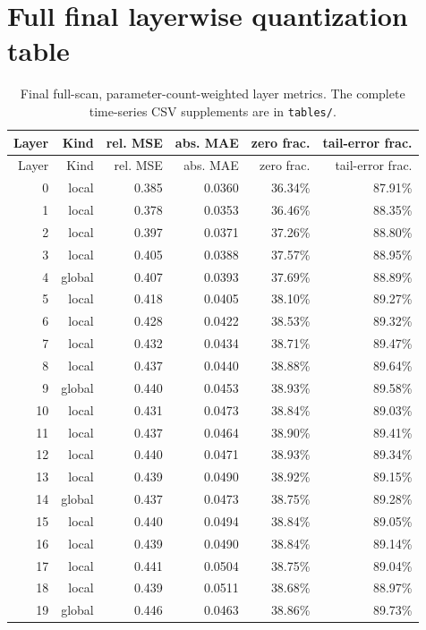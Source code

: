 \documentclass[10pt]{article}
\begin{document}
\appendix
\section{Full final layerwise quantization table}
\begin{longtable}{rrrrrr}
\caption{Final full-scan, parameter-count-weighted layer metrics. The complete time-series CSV supplements are in \texttt{tables/}.}\\
\toprule Layer & Kind & rel. MSE & abs. MAE & zero frac. & tail-error frac. \\\midrule
\endfirsthead
\toprule Layer & Kind & rel. MSE & abs. MAE & zero frac. & tail-error frac. \\\midrule
\endhead
0 & local & 0.385 & 0.0360 & 36.34\% & 87.91\% \\
1 & local & 0.378 & 0.0353 & 36.46\% & 88.35\% \\
2 & local & 0.397 & 0.0371 & 37.26\% & 88.80\% \\
3 & local & 0.405 & 0.0388 & 37.57\% & 88.95\% \\
4 & global & 0.407 & 0.0393 & 37.69\% & 88.89\% \\
5 & local & 0.418 & 0.0405 & 38.10\% & 89.27\% \\
6 & local & 0.428 & 0.0422 & 38.53\% & 89.32\% \\
7 & local & 0.432 & 0.0434 & 38.71\% & 89.47\% \\
8 & local & 0.437 & 0.0440 & 38.88\% & 89.64\% \\
9 & global & 0.440 & 0.0453 & 38.93\% & 89.58\% \\
10 & local & 0.431 & 0.0473 & 38.84\% & 89.03\% \\
11 & local & 0.437 & 0.0464 & 38.90\% & 89.41\% \\
12 & local & 0.440 & 0.0471 & 38.93\% & 89.34\% \\
13 & local & 0.439 & 0.0490 & 38.92\% & 89.15\% \\
14 & global & 0.437 & 0.0473 & 38.75\% & 89.28\% \\
15 & local & 0.440 & 0.0494 & 38.84\% & 89.05\% \\
16 & local & 0.439 & 0.0490 & 38.84\% & 89.14\% \\
17 & local & 0.441 & 0.0504 & 38.75\% & 89.04\% \\
18 & local & 0.439 & 0.0511 & 38.68\% & 88.97\% \\
19 & global & 0.446 & 0.0463 & 38.86\% & 89.73\% \\
\bottomrule
\end{longtable}
\end{document}
